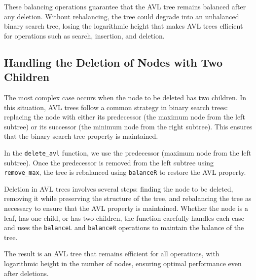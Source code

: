 \documentclass[12pt]{article}
\begin{document}
\begin{itemize}
These balancing operations guarantee that the AVL tree remains balanced after any deletion. Without rebalancing, the tree could degrade into an unbalanced binary search tree, losing the logarithmic height that makes AVL trees efficient for operations such as search, insertion, and deletion.

\subsection*{Handling the Deletion of Nodes with Two Children}

The most complex case occurs when the node to be deleted has two children. In this situation, AVL trees follow a common strategy in binary search trees: replacing the node with either its predecessor (the maximum node from the left subtree) or its successor (the minimum node from the right subtree). This ensures that the binary search tree property is maintained.

In the \texttt{delete\_avl} function, we use the predecessor (maximum node from the left subtree). Once the predecessor is removed from the left subtree using \texttt{remove\_max}, the tree is rebalanced using \texttt{balanceR} to restore the AVL property.

Deletion in AVL trees involves several steps: finding the node to be deleted, removing it while preserving the structure of the tree, and rebalancing the tree as necessary to ensure that the AVL property is maintained. Whether the node is a leaf, has one child, or has two children, the function carefully handles each case and uses the \texttt{balanceL} and \texttt{balanceR} operations to maintain the balance of the tree.

The result is an AVL tree that remains efficient for all operations, with logarithmic height in the number of nodes, ensuring optimal performance even after deletions.


\end{itemize}
\end{document}
